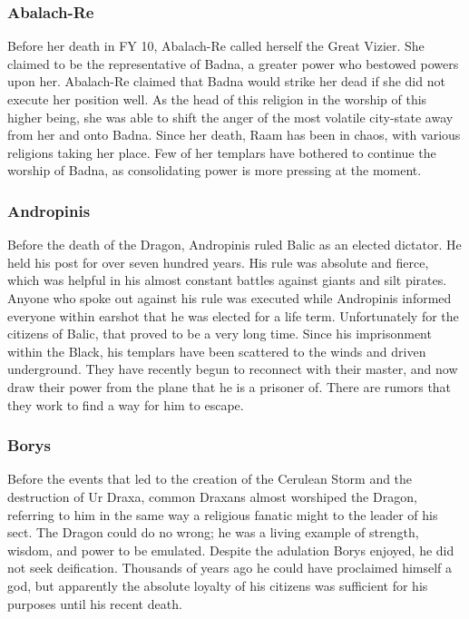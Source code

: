 \subsubsection{Abalach-Re}
Before her death in FY 10, Abalach-Re called herself the Great Vizier. She claimed to be the representative of Badna, a greater power who bestowed powers upon her. Abalach-Re claimed that Badna would strike her dead if she did not execute her position well. As the head of this religion in the worship of this higher being, she was able to shift the anger of the most volatile city-state away from her and onto Badna. Since her death, Raam has been in chaos, with various religions taking her place. Few of her templars have bothered to continue the worship of Badna, as consolidating power is more pressing at the moment.

\subsubsection{Andropinis}
Before the death of the Dragon, Andropinis ruled Balic as an elected dictator. He held his post for over seven hundred years. His rule was absolute and fierce, which was helpful in his almost constant battles against giants and silt pirates. Anyone who spoke out against his rule was executed while Andropinis informed everyone within earshot that he was elected for a life term. Unfortunately for the citizens of Balic, that proved to be a very long time. Since his imprisonment within the Black, his templars have been scattered to the winds and driven underground. They have recently begun to reconnect with their master, and now draw their power from the plane that he is a prisoner of. There are rumors that they work to find a way for him to escape.

\subsubsection{Borys}
Before the events that led to the creation of the Cerulean Storm and the destruction of Ur Draxa, common Draxans almost worshiped the Dragon, referring to him in the same way a religious fanatic might to the leader of his sect. The Dragon could do no wrong; he was a living example of strength, wisdom, and power to be emulated. Despite the adulation Borys enjoyed, he did not seek deification. Thousands of years ago he could have proclaimed himself a god, but apparently the absolute loyalty of his citizens was sufficient for his purposes until his recent death.

